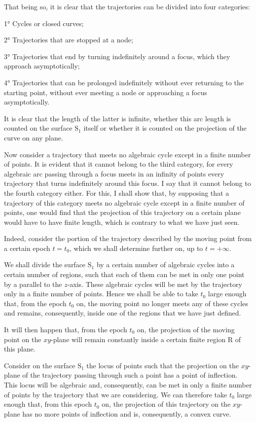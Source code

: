 \documentclass[11pt]{article}
\begin{document}
That being so, it is clear that the trajectories can be divided into four categories:

1° Cycles or closed curves;

2° Trajectories that are stopped at a node;

3° Trajectories that end by turning indefinitely around a focus, which they approach asymptotically;

4° Trajectories that can be prolonged indefinitely without ever returning to the starting point, without ever meeting a node or approaching a focus asymptotically.

It is clear that the length of the latter is infinite, whether this arc length is counted on the surface $\mathrm{S}_1$ itself or whether it is counted on the projection of the curve on any plane.

Now consider a trajectory that meets no algebraic cycle except in a finite number of points. It is evident that it cannot belong to the third category, for every algebraic arc passing through a focus meets in an infinity of points every trajectory that turns indefinitely around this focus. I say that it cannot belong to the fourth category either. For this, I shall show that, by supposing that a trajectory of this category meets no algebraic cycle except in a finite number of points, one would find that the projection of this trajectory on a certain plane would have to have finite length, which is contrary to what we have just seen.

Indeed, consider the portion of the trajectory described by the moving point from a certain epoch $t=t_0$, which we shall determine further on, up to $t=+\infty$.

We shall divide the surface $\mathrm{S}_1$ by a certain number of algebraic cycles into a certain number of regions, such that each of them can be met in only one point by a parallel to the $z$-axis. These algebraic cycles will be met by the trajectory only in a finite number of points. Hence we shall be able to take $t_0$ large enough that, from the epoch $t_0$ on, the moving point no longer meets any of these cycles and remains, consequently, inside one of the regions that we have just defined.

It will then happen that, from the epoch $t_0$ on, the projection of the moving point on the $xy$-plane will remain constantly inside a certain finite region R of this plane.

Consider on the surface $\mathrm{S}_1$ the locus of points such that the projection on the $xy$-plane of the trajectory passing through such a point has a point of inflection. This locus will be algebraic and, consequently, can be met in only a finite number of points by the trajectory that we are considering. We can therefore take $t_0$ large enough that, from this epoch $t_0$ on, the projection of this trajectory on the $xy$-plane has no more points of inflection and is, consequently, a convex curve.
\end{document}
